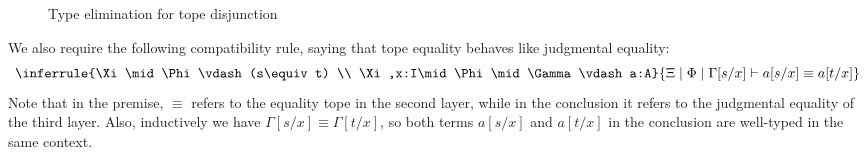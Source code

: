 \documentclass{amsart}
\theoremstyle{plain}
\theoremstyle{definition}
\theoremstyle{remark}
\numberwithin{equation}{section}
\newcommand{\jdeq}{\equiv}
\newcommand{\types}{\vdash}
\newcommand{\type}{\;\mathsf{type}}
\newcommand{\rec}{\mathsf{rec}}
\begin{document}
\begin{figure}
  \centering
  \caption{Type elimination for tope disjunction}
  \label{fig:tope-or}
\end{figure}

We also require the following compatibility rule, saying that tope equality behaves like judgmental equality:
\begin{equation}
\inferrule{\Xi\mid\Phi\types (s\jdeq t) \\ \Xi,x:I\mid\Phi\mid\Gamma\types a:A}
{\Xi\mid\Phi\mid\Gamma[s/x] \types a[s/x]\jdeq a[t/x]}\label{eq:tope-eq-jdeq}
\end{equation}
Note that in the premise, $\jdeq$ refers to the equality tope in the second layer, while in the conclusion it refers to the judgmental equality of the third layer.
Also, inductively we have $\Gamma[s/x] \jdeq \Gamma[t/x]$, so both terms $a[s/x]$ and $a[t/x]$ in the conclusion are well-typed in the same context.
\end{document}

